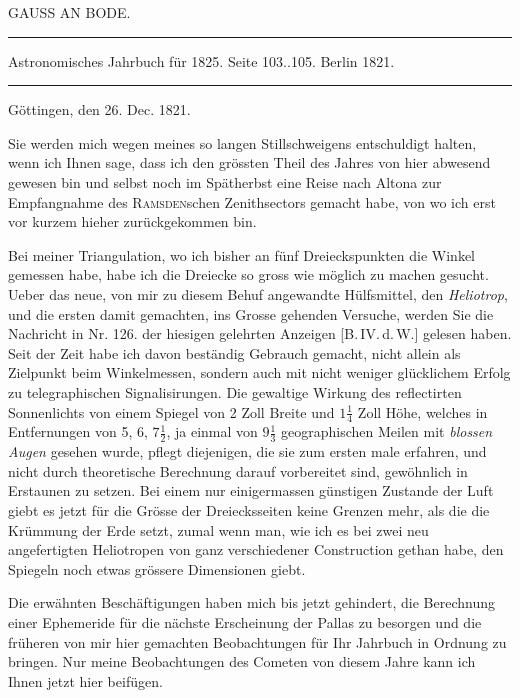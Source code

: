 \clearpage
{}
\hypertarget{native-444-part-lower}{}
\begin{center}
{\large GAUSS AN BODE.}

\noindent\rule{\linewidth}{0.4pt}

Astronomisches Jahrbuch für 1825. Seite 103..105. Berlin 1821.

\noindent\rule{\linewidth}{0.4pt}
\end{center}

\begin{flushright}
Göttingen, den 26. Dec. 1821.
\end{flushright}

Sie werden mich wegen meines so langen Stillschweigens entschuldigt halten, wenn ich Ihnen
sage, dass ich den grössten Theil des Jahres von hier abwesend gewesen bin und selbst noch im Spätherbst eine Reise nach Altona zur Empfangnahme des \textsc{Ramsden}schen Zenithsectors gemacht habe, von
wo ich erst vor kurzem hieher zurückgekommen bin.

Bei meiner Triangulation, wo ich bisher an fünf Dreieckspunkten die Winkel gemessen habe,
habe ich die Dreiecke so gross wie möglich zu machen gesucht. Ueber das neue, von mir zu diesem
Behuf angewandte Hülfsmittel, den \emph{Heliotrop}, und die ersten damit gemachten, ins Grosse gehenden
Versuche, werden Sie die Nachricht in Nr. 126. der hiesigen gelehrten Anzeigen [B.\,IV.\,d.\,W.] gelesen
haben. Seit der Zeit habe ich davon beständig Gebrauch gemacht, nicht allein als Zielpunkt beim Winkelmessen, sondern auch mit nicht weniger glücklichem Erfolg zu telegraphischen Signalisirungen. Die
gewaltige Wirkung des reflectirten Sonnenlichts von einem Spiegel von 2 Zoll Breite und $1\tfrac{1}{4}$ Zoll Höhe,
welches in Entfernungen von 5, 6, $7\tfrac{1}{2}$, ja einmal von $9\tfrac{1}{3}$ geographischen Meilen mit \emph{blossen Augen} gesehen wurde, pflegt diejenigen, die sie zum ersten male erfahren, und nicht durch theoretische Berechnung darauf vorbereitet sind, gewöhnlich in Erstaunen zu setzen. Bei einem nur einigermassen günstigen Zustande der Luft giebt es jetzt für die Grösse der Dreiecksseiten keine Grenzen mehr, als die
die Krümmung der Erde setzt, zumal wenn man, wie ich es bei zwei neu angefertigten Heliotropen von
ganz verschiedener Construction gethan habe, den Spiegeln noch etwas grössere Dimensionen giebt.

Die erwähnten Beschäftigungen haben mich bis jetzt gehindert, die Berechnung einer Ephemeride
für die nächste Erscheinung der Pallas zu besorgen und die früheren von mir hier gemachten Beobachtungen für Ihr Jahrbuch in Ordnung zu bringen. Nur meine Beobachtungen des Cometen von
diesem Jahre kann ich Ihnen jetzt hier beifügen.

